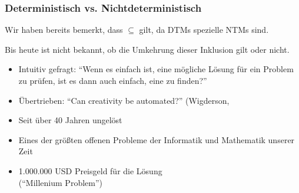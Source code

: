 \documentclass[aspectratio=1610,onlymath]{beamer}
\begin{document}
\begin{frame}\frametitle{Deterministisch vs. Nichtdeterministisch}

	Wir haben bereits bemerkt, dass  ${}\subseteq{}$  gilt, da DTMs spezielle NTMs sind.
	\medskip

  \alert{Bis heute ist nicht bekannt, ob die Umkehrung dieser Inklusion gilt oder nicht.}
  \begin{itemize}
  \item Intuitiv gefragt: "`Wenn es einfach ist, eine mögliche Lösung für ein Problem zu prüfen, ist es dann auch einfach, eine zu finden?"'
  \item Übertrieben: "`Can creativity be automated?"' (Wigderson, 
  \item Seit über 40 Jahren ungelöst
  \item Eines der größten offenen Probleme der Informatik und Mathematik unserer Zeit
  \item 1.000.000 USD Preisgeld für die Lösung\\("`Millenium Problem"')
  \end{itemize}
   
\end{frame}


% 
%    
\end{document}
